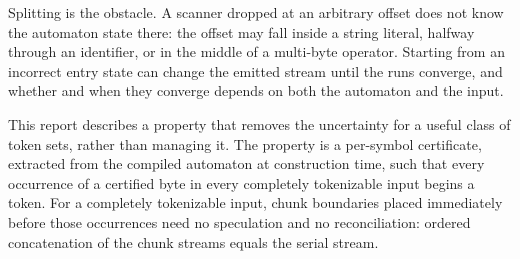\documentclass[11pt,a4paper]{article}
\theoremstyle{definition}
\theoremstyle{plain}
\begin{document}
Splitting is the obstacle. A scanner dropped at an arbitrary offset does not know the automaton state there: the
offset may fall inside a string literal, halfway through an identifier, or in the middle of a multi-byte operator.
Starting from an incorrect entry state can change the emitted stream until the runs converge, and whether and when
they converge depends on both the automaton and the input.

This report describes a property that removes the uncertainty for a useful class of token sets, rather than managing
it. The property is a per-symbol certificate, extracted from the compiled automaton at construction time, such that
every occurrence of a certified byte in every completely tokenizable input begins a token. For a completely
tokenizable input, chunk boundaries placed immediately before those occurrences need no speculation and no
reconciliation: ordered concatenation of the chunk streams equals the serial stream.
\end{document}
